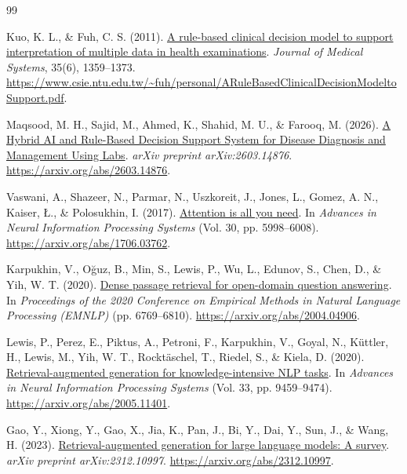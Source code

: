\cleardoublepage
{}
{}

\begin{thebibliography}{99}

Kuo, K. L., \& Fuh, C. S. (2011).
\href{https://www.csie.ntu.edu.tw/~fuh/personal/ARuleBasedClinicalDecisionModeltoSupport.pdf}{A rule-based clinical decision model to support interpretation of multiple data in health examinations}.
\textit{Journal of Medical Systems}, 35(6), 1359--1373. \url{https://www.csie.ntu.edu.tw/~fuh/personal/ARuleBasedClinicalDecisionModeltoSupport.pdf}.

Maqsood, M. H., Sajid, M., Ahmed, K., Shahid, M. U., \& Farooq, M. (2026).
\href{https://arxiv.org/abs/2603.14876}{A Hybrid AI and Rule-Based Decision Support System for Disease Diagnosis and Management Using Labs}.
\textit{arXiv preprint arXiv:2603.14876}. \url{https://arxiv.org/abs/2603.14876}.

Vaswani, A., Shazeer, N., Parmar, N., Uszkoreit, J., Jones, L., Gomez, A. N., Kaiser, Ł., \& Polosukhin, I. (2017).
\href{https://arxiv.org/abs/1706.03762}{Attention is all you need}.
In \textit{Advances in Neural Information Processing Systems} (Vol. 30, pp. 5998--6008). \url{https://arxiv.org/abs/1706.03762}.

Karpukhin, V., Oğuz, B., Min, S., Lewis, P., Wu, L., Edunov, S., Chen, D., \& Yih, W. T. (2020).
\href{https://arxiv.org/abs/2004.04906}{Dense passage retrieval for open-domain question answering}.
In \textit{Proceedings of the 2020 Conference on Empirical Methods in Natural Language Processing (EMNLP)} (pp. 6769--6810). \url{https://arxiv.org/abs/2004.04906}.

Lewis, P., Perez, E., Piktus, A., Petroni, F., Karpukhin, V., Goyal, N., Küttler, H., Lewis, M., Yih, W. T., Rocktäschel, T., Riedel, S., \& Kiela, D. (2020).
\href{https://arxiv.org/abs/2005.11401}{Retrieval-augmented generation for knowledge-intensive NLP tasks}.
In \textit{Advances in Neural Information Processing Systems} (Vol. 33, pp. 9459--9474). \url{https://arxiv.org/abs/2005.11401}.

Gao, Y., Xiong, Y., Gao, X., Jia, K., Pan, J., Bi, Y., Dai, Y., Sun, J., \& Wang, H. (2023).
\href{https://arxiv.org/abs/2312.10997}{Retrieval-augmented generation for large language models: A survey}.
\textit{arXiv preprint arXiv:2312.10997}. \url{https://arxiv.org/abs/2312.10997}.


\end{thebibliography}

